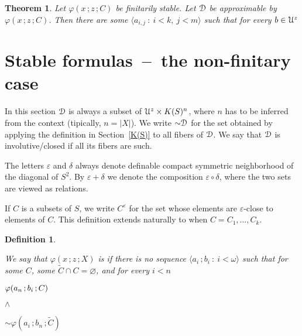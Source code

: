 \documentclass{amsproc}
\newcounter{thm}
\theoremstyle{mio}
\newtheorem{theorem}[thm]{Theorem}\tcolorboxenvironment{theorem}{mythm}
\newtheorem{definition}[thm]{Definition}\tcolorboxenvironment{definition}{mythm}
\renewcommand*{\emph}[1]{%
   \smash{\tikz[baseline]\node[rectangle, fill=teal!25, rounded corners, inner xsep=0.5ex, inner ysep=0.2ex, anchor=base, minimum height = 2.7ex]{\strut #1};}}
\begin{document}
\begin{theorem}
  Let $\varphi(x\,;z\,;C)$ be finitarily stable.
  Let ${\EuScript D}$ be approximable by $\varphi(x\,;z\,;C)$.
  Then there are some $\langle a_{i,j}\ :\ i< k,\ j<m\rangle$ such that for every $b\in{\EuScript U}^z$\medskip

\end{theorem}


\section{Stable formulas~--~the non-finitary case}
\def\medrel#1{\parbox{5ex}{\hfil $#1$}}
\def\ceq#1#2#3{\parbox[t]{22ex}{$\displaystyle #1$}\medrel{#2}{$\displaystyle #3$}}

In this section  ${\EuScript D}$ is always a subset of ${\EuScript U}^z\times K(S)^n$, where $n$ has to be inferred from the context (tipically, $n=|X|$).
We write ${\sim}{\EuScript D}$ for the set obtained by applying the definition in Section~\ref{K(S)} to all fibers of ${\EuScript D}$.
We say that ${\EuScript D}$ is involutive/closed if all its fibers are such.

The letters $\varepsilon$ and $\delta$ always denote definable compact symmetric neighborhood of the diagonal of $S^2$.
By $\varepsilon+\delta$ we denote the composition $\varepsilon\circ\delta$, where the two sets are viewed as relations.

If $C$ is a subsets of $S$, we write $C^\varepsilon$ for the set whose elements are $\varepsilon$-close to elements of $C$.
This definition extends naturally to when $C=C_1,\dots,C_k$.

\begin{definition}\label{def_stable_inf}\strut
  We say that $\varphi(x\,;z\,;X)$ is \emph{stable\/} if there is no sequence $\langle a_i\,;b_i\ :\ i<\omega\rangle$ such that for some $C$, some $\tilde C\cap C=\varnothing$, and for every $i<n$\smallskip

  \ceq{\hfill \varphi(a_n\,;b_i\,;C)}{\wedge}{{\sim}\varphi(a_i\,;b_n\,;\tilde C)}\smallskip

\end{definition}
\end{document}
